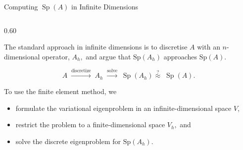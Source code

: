 \documentclass[aspectratio=169]{beamer}
\begin{document}


\begin{frame}{Computing \(\operatorname{Sp}(A)\) in Infinite Dimensions}

\begin{columns}[T,onlytextwidth]

\begin{column}{0.60\textwidth}

The standard approach in infinite dimensions is to discretise $A$ with an $n$-dimensional operator, $A_h,$ and argue that $\text{Sp}(A_h)$ approaches $\text{Sp}(A).$


\vspace{0.2cm}

\[
A
\;\xrightarrow{\text{discretize}}\;
A_h
\;\xrightarrow{\text{solve}}\;
\operatorname{Sp}(A_h)
\stackrel{?}{\approx}\;
\operatorname{Sp}(A).
\]

\vspace{0.3cm}

To use the finite element method, we
\begin{itemize}
    \item formulate the variational eigenproblem in an infinite-dimensional space \(V\),
    \item restrict the problem to a finite-dimensional space $V_h,$ and
    \item solve the discrete eigenproblem for $\text{Sp}(A_h).$
\end{itemize}


\end{column}
\end{columns}
\end{frame}
\end{document}
